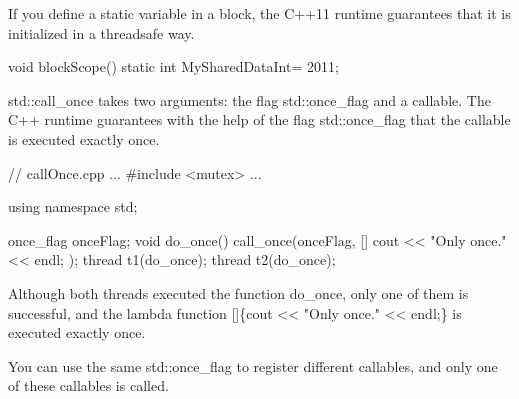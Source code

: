 
If you define a static variable in a block, the C++11 runtime guarantees that it is initialized in a threadsafe way.

\begin{cpp}
void blockScope(){
	static int MySharedDataInt= 2011;
}
\end{cpp}


std::call\_once takes two arguments: the flag std::once\_flag and a callable. The C++ runtime guarantees with the help of the flag std::once\_flag that the callable is executed exactly once.


\begin{cpp}
// callOnce.cpp
...
#include <mutex>
...

using namespace std;

once_flag onceFlag;
void do_once(){
	call_once(onceFlag, []{ cout << "Only once." << endl; });
}
thread t1(do_once);
thread t2(do_once);
\end{cpp}

Although both threads executed the function do\_once, only one of them is successful, and the lambda function []\{cout <{}< "Only once." <{}< endl;\} is executed exactly once.


You can use the same std::once\_flag to register different callables, and only one of these callables is called.


